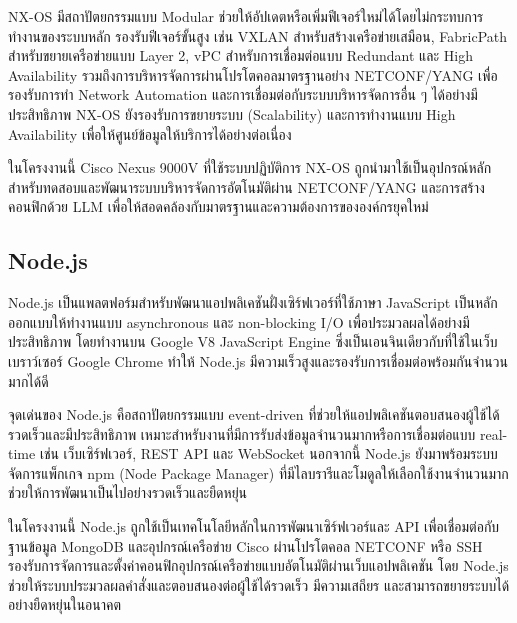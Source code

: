 \hspace*{1.3em} %
NX-OS มีสถาปัตยกรรมแบบ Modular ช่วยให้อัปเดตหรือเพิ่มฟีเจอร์ใหม่ได้โดยไม่กระทบการทำงานของระบบหลัก รองรับฟีเจอร์ขั้นสูง เช่น VXLAN สำหรับสร้างเครือข่ายเสมือน, FabricPath สำหรับขยายเครือข่ายแบบ Layer 2, vPC สำหรับการเชื่อมต่อแบบ Redundant และ High Availability รวมถึงการบริหารจัดการผ่านโปรโตคอลมาตรฐานอย่าง NETCONF/YANG เพื่อรองรับการทำ Network Automation และการเชื่อมต่อกับระบบบริหารจัดการอื่น ๆ ได้อย่างมีประสิทธิภาพ NX-OS ยังรองรับการขยายระบบ (Scalability) และการทำงานแบบ High Availability เพื่อให้ศูนย์ข้อมูลให้บริการได้อย่างต่อเนื่อง

\hspace*{1.3em} %
ในโครงงานนี้ Cisco Nexus 9000V ที่ใช้ระบบปฏิบัติการ NX-OS ถูกนำมาใช้เป็นอุปกรณ์หลักสำหรับทดสอบและพัฒนาระบบบริหารจัดการอัตโนมัติผ่าน NETCONF/YANG และการสร้างคอนฟิกด้วย LLM เพื่อให้สอดคล้องกับมาตรฐานและความต้องการขององค์กรยุคใหม่
\parencite{nexus}

\subsection{Node.js}

\hspace*{1.3em} %
Node.js เป็นแพลตฟอร์มสำหรับพัฒนาแอปพลิเคชันฝั่งเซิร์ฟเวอร์ที่ใช้ภาษา JavaScript เป็นหลัก ออกแบบให้ทำงานแบบ asynchronous และ non-blocking I/O เพื่อประมวลผลได้อย่างมีประสิทธิภาพ โดยทำงานบน Google V8 JavaScript Engine ซึ่งเป็นเอนจินเดียวกับที่ใช้ในเว็บเบราว์เซอร์ Google Chrome ทำให้ Node.js มีความเร็วสูงและรองรับการเชื่อมต่อพร้อมกันจำนวนมากได้ดี

\hspace*{1.3em} %
จุดเด่นของ Node.js คือสถาปัตยกรรมแบบ event-driven ที่ช่วยให้แอปพลิเคชันตอบสนองผู้ใช้ได้รวดเร็วและมีประสิทธิภาพ เหมาะสำหรับงานที่มีการรับส่งข้อมูลจำนวนมากหรือการเชื่อมต่อแบบ real-time เช่น เว็บเซิร์ฟเวอร์, REST API และ WebSocket นอกจากนี้ Node.js ยังมาพร้อมระบบจัดการแพ็กเกจ npm (Node Package Manager) ที่มีไลบรารีและโมดูลให้เลือกใช้งานจำนวนมาก ช่วยให้การพัฒนาเป็นไปอย่างรวดเร็วและยืดหยุ่น

\hspace*{1.3em} %
ในโครงงานนี้ Node.js ถูกใช้เป็นเทคโนโลยีหลักในการพัฒนาเซิร์ฟเวอร์และ API เพื่อเชื่อมต่อกับฐานข้อมูล MongoDB และอุปกรณ์เครือข่าย Cisco ผ่านโปรโตคอล NETCONF หรือ SSH รองรับการจัดการและตั้งค่าคอนฟิกอุปกรณ์เครือข่ายแบบอัตโนมัติผ่านเว็บแอปพลิเคชัน โดย Node.js ช่วยให้ระบบประมวลผลคำสั่งและตอบสนองต่อผู้ใช้ได้รวดเร็ว มีความเสถียร และสามารถขยายระบบได้อย่างยืดหยุ่นในอนาคต \parencite{nodejs}

